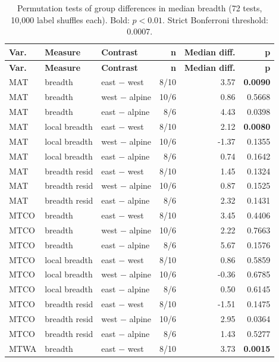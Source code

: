 {\small
\begin{longtable}{lllrrr}
\caption{Permutation tests of group differences in median breadth (72 tests, 10,000 label shuffles each). Bold: $p<0.01$. Strict Bonferroni threshold: 0.0007.}\label{tab:perm}\\
\toprule
\textbf{Var.} & \textbf{Measure} & \textbf{Contrast} & \textbf{n} & \textbf{Median diff.} & \textbf{p} \\
\midrule
\endfirsthead
\toprule
\textbf{Var.} & \textbf{Measure} & \textbf{Contrast} & \textbf{n} & \textbf{Median diff.} & \textbf{p} \\
\midrule
\endhead
\bottomrule
\endfoot
MAT & breadth & east $-$ west & 8/10 & 3.57 & \textbf{0.0090} \\
MAT & breadth & west $-$ alpine & 10/6 & 0.86 & 0.5668 \\
MAT & breadth & east $-$ alpine & 8/6 & 4.43 & 0.0398 \\
MAT & local breadth & east $-$ west & 8/10 & 2.12 & \textbf{0.0080} \\
MAT & local breadth & west $-$ alpine & 10/6 & -1.37 & 0.1355 \\
MAT & local breadth & east $-$ alpine & 8/6 & 0.74 & 0.1642 \\
MAT & breadth resid & east $-$ west & 8/10 & 1.45 & 0.1324 \\
MAT & breadth resid & west $-$ alpine & 10/6 & 0.87 & 0.1525 \\
MAT & breadth resid & east $-$ alpine & 8/6 & 2.32 & 0.1431 \\
MTCO & breadth & east $-$ west & 8/10 & 3.45 & 0.4406 \\
MTCO & breadth & west $-$ alpine & 10/6 & 2.22 & 0.7663 \\
MTCO & breadth & east $-$ alpine & 8/6 & 5.67 & 0.1576 \\
MTCO & local breadth & east $-$ west & 8/10 & 0.86 & 0.5859 \\
MTCO & local breadth & west $-$ alpine & 10/6 & -0.36 & 0.6785 \\
MTCO & local breadth & east $-$ alpine & 8/6 & 0.50 & 0.6145 \\
MTCO & breadth resid & east $-$ west & 8/10 & -1.51 & 0.1475 \\
MTCO & breadth resid & west $-$ alpine & 10/6 & 2.95 & 0.0364 \\
MTCO & breadth resid & east $-$ alpine & 8/6 & 1.43 & 0.5277 \\
MTWA & breadth & east $-$ west & 8/10 & 3.73 & \textbf{0.0015} \\

\end{longtable}}
